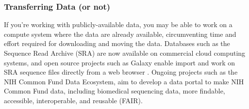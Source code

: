\documentclass[10pt,letterpaper]{article}
\begin{document}
\begin{table}
\caption{\label{tab:computational_resources} \textbf{Research cloud resources} Cloud provider indicates the name of the cloud, standard model indicates the most common route toward using the cloud, and limitations indicates limitations in access or services provided by the cloud.}
\end{table}


\subsubsection*{Transferring Data (or not)} 

If you're working with publicly-available data, you may be able to work on a compute system where the data are already available, circumventing time and effort required for downloading and moving the data.
Databases such as the Sequence Read Archive (SRA) are now available on commercial cloud computing systems, and open source projects such as Galaxy enable import and work on SRA sequence files directly from a web browser \cite{afgan2018galaxy, noauthor_sra_nodate}. 
Ongoing projects such as the NIH Common Fund Data Ecosystem, aim to develop a data portal to make NIH Common Fund data, including biomedical sequencing data, more findable,
accessible, interoperable, and reusable (FAIR). 
\end{document}
